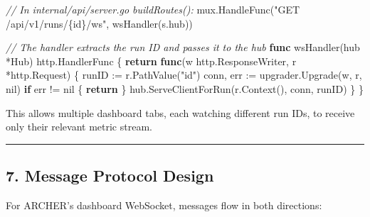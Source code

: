 \documentclass[
]{article}
\newenvironment{Shaded}{}{}
\newcommand{\CommentTok}[1]{\textcolor[rgb]{0.38,0.63,0.69}{\textit{#1}}}
\newcommand{\ControlFlowTok}[1]{\textcolor[rgb]{0.00,0.44,0.13}{\textbf{#1}}}
\newcommand{\KeywordTok}[1]{\textcolor[rgb]{0.00,0.44,0.13}{\textbf{#1}}}
\newcommand{\NormalTok}[1]{#1}
\newcommand{\OperatorTok}[1]{\textcolor[rgb]{0.40,0.40,0.40}{#1}}
\newcommand{\OtherTok}[1]{\textcolor[rgb]{0.00,0.44,0.13}{#1}}
\newcommand{\StringTok}[1]{\textcolor[rgb]{0.25,0.44,0.63}{#1}}
\begin{document}
\begin{Shaded}
\begin{Highlighting}[]
\CommentTok{// In internal/api/server.go buildRoutes():}
\NormalTok{mux}\OperatorTok{.}\NormalTok{HandleFunc}\OperatorTok{(}\StringTok{"GET /api/v1/runs/\{id\}/ws"}\OperatorTok{,}\NormalTok{ wsHandler}\OperatorTok{(}\NormalTok{s}\OperatorTok{.}\NormalTok{hub}\OperatorTok{))}

\CommentTok{// The handler extracts the run ID and passes it to the hub}
\KeywordTok{func}\NormalTok{ wsHandler}\OperatorTok{(}\NormalTok{hub }\OperatorTok{*}\NormalTok{Hub}\OperatorTok{)}\NormalTok{ http}\OperatorTok{.}\NormalTok{HandlerFunc }\OperatorTok{\{}
    \ControlFlowTok{return} \KeywordTok{func}\OperatorTok{(}\NormalTok{w http}\OperatorTok{.}\NormalTok{ResponseWriter}\OperatorTok{,}\NormalTok{ r }\OperatorTok{*}\NormalTok{http}\OperatorTok{.}\NormalTok{Request}\OperatorTok{)} \OperatorTok{\{}
\NormalTok{        runID }\OperatorTok{:=}\NormalTok{ r}\OperatorTok{.}\NormalTok{PathValue}\OperatorTok{(}\StringTok{"id"}\OperatorTok{)}
\NormalTok{        conn}\OperatorTok{,}\NormalTok{ err }\OperatorTok{:=}\NormalTok{ upgrader}\OperatorTok{.}\NormalTok{Upgrade}\OperatorTok{(}\NormalTok{w}\OperatorTok{,}\NormalTok{ r}\OperatorTok{,} \OtherTok{nil}\OperatorTok{)}
        \ControlFlowTok{if}\NormalTok{ err }\OperatorTok{!=} \OtherTok{nil} \OperatorTok{\{}
            \ControlFlowTok{return}
        \OperatorTok{\}}
\NormalTok{        hub}\OperatorTok{.}\NormalTok{ServeClientForRun}\OperatorTok{(}\NormalTok{r}\OperatorTok{.}\NormalTok{Context}\OperatorTok{(),}\NormalTok{ conn}\OperatorTok{,}\NormalTok{ runID}\OperatorTok{)}
    \OperatorTok{\}}
\OperatorTok{\}}
\end{Highlighting}
\end{Shaded}

This allows multiple dashboard tabs, each watching different run IDs, to
receive only their relevant metric stream.

\begin{center}\rule{0.5\linewidth}{0.5pt}\end{center}

\hypertarget{message-protocol-design}{%
\subsection{7. Message Protocol Design}\label{message-protocol-design}}

For ARCHER's dashboard WebSocket, messages flow in both directions:
\end{document}
